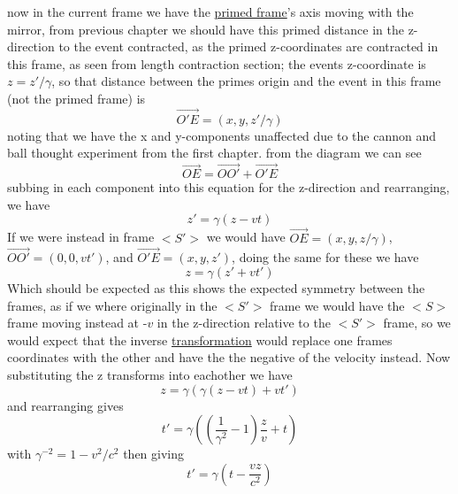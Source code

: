 now in the current frame we have the \hyperlink{def-Primed-Frame}{primed frame}'s axis moving with the mirror, from previous chapter we should have this primed distance in the z-direction to the event contracted, as the primed z-coordinates are contracted in this frame, as seen from length contraction section; the events z-coordinate is $z=z'/\gamma$, so that distance between the primes origin and the event in this frame (not the primed frame) is
\begin{equation}
	\overrightarrow{O'E} = (x,y,z'/\gamma)
\end{equation}
noting that we have the x and y-components unaffected due to the cannon and ball thought experiment from the first chapter. from the diagram we can see
\begin{equation}%
	\overrightarrow{OE}= \overrightarrow{OO'} + \overrightarrow{O'E}
	\label{eq: event}
\end{equation}%
subbing in each component into this equation for the z-direction and rearranging, we have
\begin{equation}%
	z' = \gamma (z-vt)
\end{equation}%
If we were instead in frame $<S'>$ we would have $\overrightarrow{OE}=(x,y,z/\gamma)$, $\overrightarrow{OO'}=(0,0,vt')$, and $\overrightarrow{O'E} = (x,y,z')$, doing the same for these we have
\begin{equation}%
	z = \gamma (z'+vt')
\end{equation}%
Which should be expected as this shows the expected symmetry between the frames, as if we where originally in the $<S'>$ frame we would have the $<S>$ frame moving instead at -$v$ in the z-direction relative to the $<S'>$ frame, so we would expect that the inverse \hyperlink{def-transform}{transformation} would replace one frames coordinates with the other and have the the negative of the velocity instead.
Now substituting the z transforms into eachother we have
\begin{equation}%
	z = \gamma ( \gamma (z-vt)+vt')
\end{equation}%
and rearranging gives
\begin{equation}%
	t' = \gamma \left( \left( \dfrac{1}{\gamma^2}-1 \right)\frac{z}{v} + t \right)
\end{equation}%
with $\gamma^{-2}=1-v^2/c^2$ then giving
\begin{equation}%
	t' = \gamma \left( t - \dfrac{vz}{c^2} \right)
\end{equation}%
